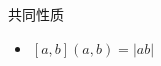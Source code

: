 \begin{frame}{共同性质}
	\label{prime:prop:gcdlcm-common}

	\begin{itemize}
		\item \([a,b](a,b)=|ab|\)
	\end{itemize}
\end{frame}
